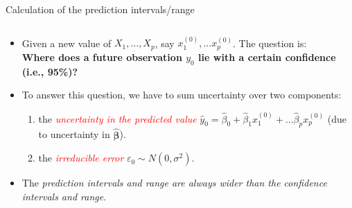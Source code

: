 \documentclass[10pt,ignorenonframetext,]{beamer}
\providecommand{\tightlist}{%
  \setlength{\itemsep}{0pt}\setlength{\parskip}{0pt}}
\begin{document}
\begin{frame}

\begin{block}{Calculation of the prediction intervals/range}

\(~\)

\begin{itemize}
\tightlist
\item
  Given a new value of \(X_1, \ldots, X_p\), say
  \(x_1^{(0)}, \ldots x_p^{(0)}\). The question is:\\
  \vspace{2mm} \textbf{Where does a future observation \(y_0\) lie with
  a certain confidence (i.e., 95\%)?}
\end{itemize}

\vspace{6mm}

\begin{itemize}
\item
  To answer this question, we have to sum uncertainty over two
  components:

  \begin{enumerate}
  \item
    the \emph{\textcolor{red}{uncertainty in the predicted value}}
    \(\hat y_0 = \hat\beta_0 + \hat\beta_1 x_1^{(0)} + \ldots \hat\beta_p x_p^{(0)}\)
    (due to uncertainty in \(\hat{\boldsymbol\beta}\)).
  \item
    the \emph{\textcolor{red}{irreducible error}}
    \(\varepsilon_0 \sim N(0,\sigma^2)\).
  \end{enumerate}
\end{itemize}

\vspace{4mm}

\begin{itemize}
\tightlist
\item
  The \emph{prediction intervals and range are always wider than the
  confidence intervals and range}.
\end{itemize}

\end{block}

\end{frame}
\end{document}
